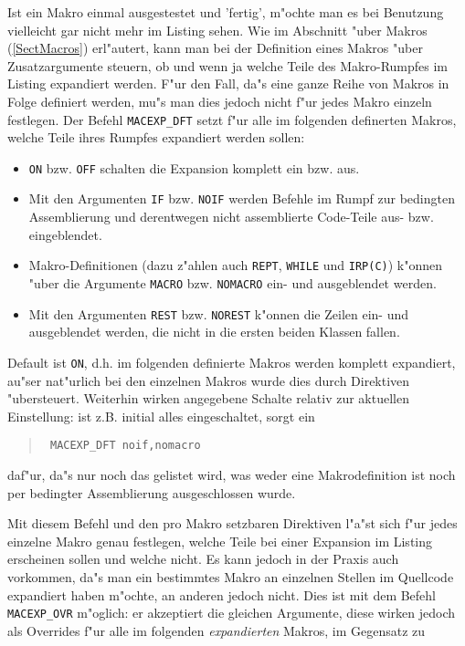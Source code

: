 \documentclass[12pt,a4paper,twoside]{report}
\newcommand{\tty}[1]{{\tt #1}}
\begin{document}
Ist ein Makro einmal ausgestestet und 'fertig', m"ochte man es bei
Benutzung vielleicht gar nicht mehr im Listing sehen.  Wie im
Abschnitt "uber Makros (\ref{SectMacros}) erl"autert, kann man bei der
Definition eines Makros "uber Zusatzargumente steuern, ob und wenn ja
welche Teile des Makro-Rumpfes im Listing expandiert werden.  F"ur den
Fall, da"s eine ganze Reihe von Makros in Folge definiert werden,
mu"s man dies jedoch nicht f"ur jedes Makro einzeln festlegen.  Der
Befehl \tty{MACEXP\_DFT} setzt f"ur alle im folgenden definerten Makros,
welche Teile ihres Rumpfes expandiert werden sollen:
\begin{itemize}
\item{\tty{ON} bzw. \tty{OFF} schalten die Expansion komplett
      ein bzw. aus.}
\item{Mit den Argumenten \tty{IF} bzw. \tty{NOIF} werden Befehle
      im Rumpf zur bedingten Assemblierung und derentwegen nicht
      assemblierte Code-Teile aus- bzw. eingeblendet.}
\item{Makro-Definitionen (dazu z"ahlen auch \tty{REPT},
      \tty{WHILE} und \tty{IRP(C)}) k"onnen "uber die Argumente
      \tty{MACRO} bzw. \tty{NOMACRO} ein- und
      ausgeblendet werden.}
\item{Mit den Argumenten \tty{REST} bzw. \tty{NOREST} k"onnen die
      Zeilen ein- und ausgeblendet werden, die nicht in die ersten
      beiden Klassen fallen.}
\end{itemize}
Default ist \tty{ON}, d.h. im folgenden definierte Makros werden
komplett expandiert, au"ser nat"urlich bei den einzelnen Makros wurde
dies durch Direktiven "ubersteuert.  Weiterhin wirken angegebene Schalte
relativ zur aktuellen Einstellung: ist z.B. initial alles eingeschaltet,
sorgt ein
\begin{quote}{\tt
        MACEXP\_DFT  noif,nomacro
}\end{quote}
daf"ur, da"s nur noch das gelistet wird, was weder eine Makrodefinition
ist noch per bedingter Assemblierung ausgeschlossen wurde.
\par
Mit diesem Befehl und den pro Makro setzbaren Direktiven l"a"st sich
f"ur jedes einzelne Makro genau festlegen, welche Teile bei einer
Expansion im Listing erscheinen sollen und welche nicht.  Es kann
jedoch in der Praxis auch vorkommen, da"s man ein bestimmtes Makro an
einzelnen Stellen im Quellcode expandiert haben m"ochte, an anderen
jedoch nicht.  Dies ist mit dem Befehl \tty{MACEXP\_OVR} m"oglich: er
akzeptiert die gleichen Argumente, diese wirken jedoch als Overrides
f"ur alle im folgenden {\em expandierten} Makros, im Gegensatz zu
\end{document}
